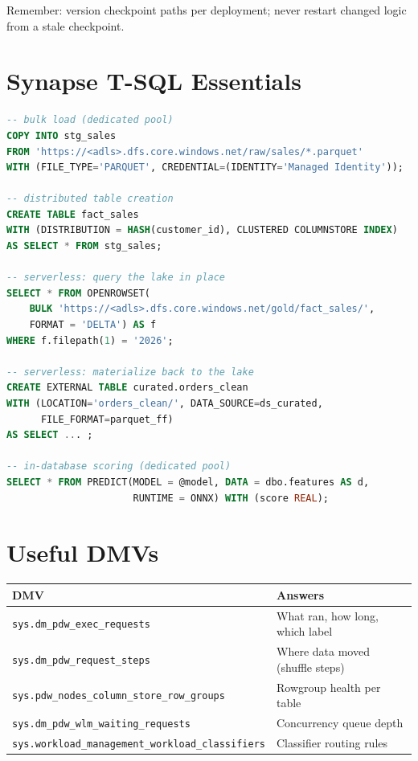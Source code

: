 Remember: version checkpoint paths per deployment; never restart changed logic
from a stale checkpoint.

\section{Synapse T-SQL Essentials}

\begin{lstlisting}[language=SQL,caption={Dedicated and serverless pool statements used in Chapters 5--8.},label={lst:app-tsql}]
-- bulk load (dedicated pool)
COPY INTO stg_sales
FROM 'https://<adls>.dfs.core.windows.net/raw/sales/*.parquet'
WITH (FILE_TYPE='PARQUET', CREDENTIAL=(IDENTITY='Managed Identity'));

-- distributed table creation
CREATE TABLE fact_sales
WITH (DISTRIBUTION = HASH(customer_id), CLUSTERED COLUMNSTORE INDEX)
AS SELECT * FROM stg_sales;

-- serverless: query the lake in place
SELECT * FROM OPENROWSET(
    BULK 'https://<adls>.dfs.core.windows.net/gold/fact_sales/',
    FORMAT = 'DELTA') AS f
WHERE f.filepath(1) = '2026';

-- serverless: materialize back to the lake
CREATE EXTERNAL TABLE curated.orders_clean
WITH (LOCATION='orders_clean/', DATA_SOURCE=ds_curated,
      FILE_FORMAT=parquet_ff)
AS SELECT ... ;

-- in-database scoring (dedicated pool)
SELECT * FROM PREDICT(MODEL = @model, DATA = dbo.features AS d,
                      RUNTIME = ONNX) WITH (score REAL);
\end{lstlisting}

\section{Useful DMVs}
\begin{center}
\footnotesize
\begin{tabular}{@{}p{6.4cm}p{6.8cm}@{}}
\toprule
\textbf{DMV} & \textbf{Answers} \\
\midrule
\texttt{sys.dm\_pdw\_exec\_requests} & What ran, how long, which label \\
\texttt{sys.dm\_pdw\_request\_steps} & Where data moved (shuffle steps) \\
\texttt{sys.pdw\_nodes\_column\_store\_row\_groups} & Rowgroup health per table \\
\texttt{sys.dm\_pdw\_wlm\_waiting\_requests} & Concurrency queue depth \\
\texttt{sys.workload\_management\_workload\_classifiers} & Classifier routing rules \\
\bottomrule
\end{tabular}
\end{center}

